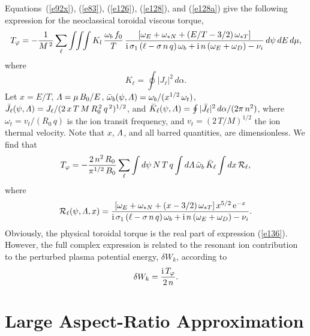 \documentclass[12pt,prb,aps,notitlepage]{revtex4-1}
\begin{document}
Equations~(\ref{e92x}), (\ref{e83}), (\ref{e126}), (\ref{e128}), and (\ref{e128a}) give the following expression for the neoclassical toroidal viscous torque,
\begin{equation}
T_\varphi =- \frac{1}{M^{\,2}}\sum_\ell\int\!\!\int\!\!\int K_l\,\frac{\omega_b\,f_0}{T}\,\frac{[\omega_E + \omega_{\ast N}+(E/T-3/2)\,\omega_{\ast T}]}{
{\rm i}\,\sigma_1\,(\ell - \sigma\,n\,q)\,\omega_b +{\rm i}\,n\,(\omega_E+\omega_D)-\nu_i}\,d\psi\,dE\,d\mu,
\end{equation}
where
\begin{equation}
K_\ell = \oint| J_\ell|^2\,d\alpha.
\end{equation}
Let $x=E/T$, ${\mit\Lambda}=\mu\,B_0/E$, $\bar{\omega}_b(\psi,{\mit\Lambda}) =\omega_b/(x^{1/2}\,\omega_t)$, $\bar{J}_\ell(\psi,{\mit\Lambda}) = J_\ell/(2\,x\,T\,M\,R_0^{\,2}\,q^{\,2})^{1/2}$,
and $\bar{K}_\ell(\psi, {\mit\Lambda}) = \oint |\bar{J}_\ell|^2\,d\alpha/(2\pi\,n^2)$, where $\omega_t = v_t/(R_0\,q)$ is the ion transit frequency,  and $v_t=(2\,T/M)^{1/2}$ the ion thermal velocity. Note that $x$,
${\mit\Lambda}$, and all barred quantities, are dimensionless. We find that
\begin{equation}\label{e136}
T_\varphi = - \frac{2\,n^2\,R_0}{\pi^{1/2}\,B_0}\sum_\ell\int d\psi\,N\,T\,q\int d{\mit\Lambda}\,\bar{\omega}_b\,\bar{K}_\ell\int dx\,{\cal R}_\ell,
\end{equation}
where
\begin{equation}
{\cal R}_\ell(\psi,{\mit\Lambda},x) =\frac{[\omega_E + \omega_{\ast N}+(x-3/2)\,\omega_{\ast T}]\,x^{5/2}\,{\rm e}^{-x}}{
{\rm i}\,\sigma_1\,(\ell - \sigma\,n\,q)\,\omega_b +{\rm i}\,n\,(\omega_E+\omega_D)-\nu_i}.
\end{equation}
Obviously, the physical toroidal torque is the real part of expression (\ref{e136}). However, the full complex expression is related to the resonant ion contribution to the
perturbed plasma potential energy, $\delta W_k$, according to
\begin{equation}
\delta W_k = \frac{{\rm i}\,T_\varphi}{2\,n}.
\end{equation}

\section{Large Aspect-Ratio Approximation}
\end{document}
